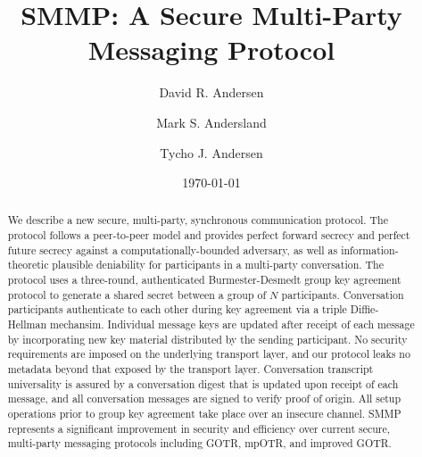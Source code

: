 \documentclass[%
preprint,
amsmath,amssymb,
aps,
prb,
floatfix,
]{revtex4-1}
\begin{document}

\title{SMMP: A Secure Multi-Party Messaging Protocol}%

\author{David R. Andersen}
\author{Mark S. Andersland}
\author{Tycho J. Andersen}

\date{\today}%

\begin{abstract}
We describe a new secure, multi-party, synchronous communication protocol.
The protocol follows a peer-to-peer model and provides perfect forward
secrecy and perfect future secrecy against a computationally-bounded adversary,
as well as information-theoretic plausible deniability for participants in
a multi-party conversation.
The protocol uses a three-round, authenticated Burmester-Desmedt group key agreement
protocol to generate a shared secret between a group of $N$ participants.
Conversation participants authenticate to each other
during key agreement via a triple Diffie-Hellman mechansim.
Individual message keys are updated after receipt of each message by incorporating
new key material distributed by the sending participant.
No security requirements are imposed on the underlying transport layer, and
our protocol leaks no metadata beyond that exposed by the transport layer.
Conversation transcript universality is assured by a conversation digest that is updated
upon receipt of each message, and all conversation messages are signed to
verify proof of origin.
All setup operations prior to group key agreement take place over an insecure
channel.
SMMP represents a significant improvement in security and efficiency over
current secure, multi-party messaging protocols including GOTR, mpOTR, and
improved GOTR.
\end{abstract}

\maketitle
\end{document}
